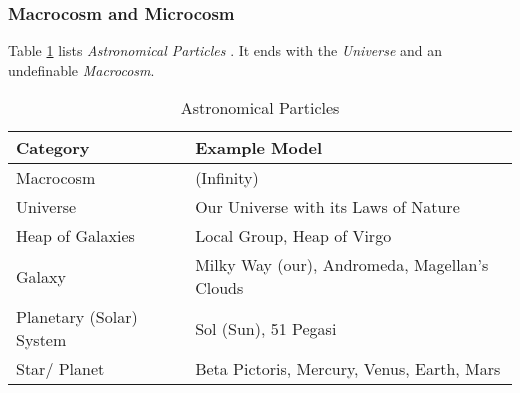 %
%
%
%
%
%
%

\subsubsection{Macrocosm and Microcosm}
\label{macrocosm_and_microcosm_heading}

Table \ref{astronomical_table} lists \emph{Astronomical Particles}
\cite{fernandezdavid, arnett}. It ends with the \emph{Universe} and an
undefinable \emph{Macrocosm}.

\begin{table}[ht]
    \begin{center}
        \begin{footnotesize}
        \begin{tabular}{| p{40mm} | p{65mm} |}
            \hline
            \textbf{Category} & \textbf{Example Model}\\
            \hline
            Macrocosm & (Infinity)\\
            \hline
            Universe & Our Universe with its Laws of Nature\\
            \hline
            Heap of Galaxies & Local Group, Heap of Virgo\\
            \hline
            Galaxy & Milky Way (our), Andromeda, Magellan's Clouds\\
            \hline
            Planetary (Solar) System & Sol (Sun), 51 Pegasi\\
            \hline
            Star/ Planet & Beta Pictoris, Mercury, Venus, Earth, Mars\\
            \hline
        \end{tabular}
        \end{footnotesize}
        \caption{Astronomical Particles}
        \label{astronomical_table}
    \end{center}
\end{table}

